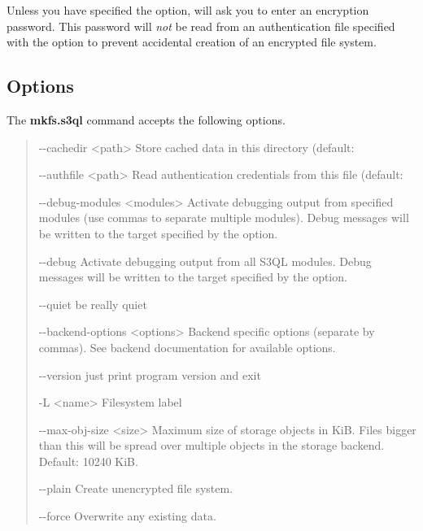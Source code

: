 \documentclass[letterpaper,10pt,english]{sphinxmanual}
\begin{document}
Unless you have specified the  option,  will ask
you to enter an encryption password. This password will \emph{not} be read
from an authentication file specified with the 
option to prevent accidental creation of an encrypted file system.


\subsection{Options}
\label{man/mkfs:options}
The \textbf{mkfs.s3ql} command accepts the following options.
\begin{quote}
\begin{optionlist}{3cm}
\item [-{-}cachedir \textless{}path\textgreater{}]  
Store cached data in this directory (default:
\item [-{-}authfile \textless{}path\textgreater{}]  
Read authentication credentials from this file
(default: 
\item [-{-}debug-modules \textless{}modules\textgreater{}]  
Activate debugging output from specified modules (use
commas to separate multiple modules). Debug messages
will be written to the target specified by the
 option.
\item [-{-}debug]  
Activate debugging output from all S3QL modules. Debug
messages will be written to the target specified by
the  option.
\item [-{-}quiet]  
be really quiet
\item [-{-}backend-options \textless{}options\textgreater{}]  
Backend specific options (separate by commas). See
backend documentation for available options.
\item [-{-}version]  
just print program version and exit
\item [-L \textless{}name\textgreater{}]  
Filesystem label
\item [-{-}max-obj-size \textless{}size\textgreater{}]  
Maximum size of storage objects in KiB. Files bigger
than this will be spread over multiple objects in the
storage backend. Default: 10240 KiB.
\item [-{-}plain]  
Create unencrypted file system.
\item [-{-}force]  
Overwrite any existing data.
\end{optionlist}
\end{quote}
\end{document}
